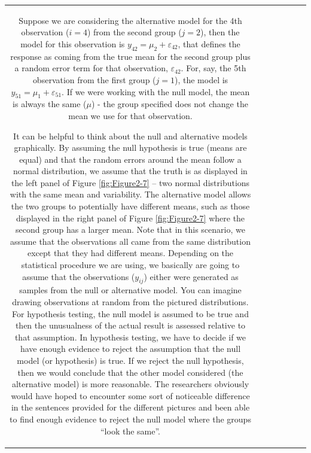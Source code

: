 \documentclass[]{book}
\theoremstyle{definition}
\theoremstyle{definition}
\theoremstyle{remark}
\begin{document}
\begin{longtable}[]{@{}ccccccc@{}}
\begin{minipage}[b]{0.10\columnwidth}
Suppose we are considering the alternative model for the 4th observation
(\(i=4\)) from the second group (\(j=2\)), then the model for this
observation is \(y_{42} = \mu_2 +\varepsilon_{42}\), that defines the
response as coming from the true mean for the second group plus a random
error term for that observation, \(\varepsilon_{42}\). For, say, the 5th
observation from the first group (\(j=1\)), the model is
\(y_{51} = \mu_1 +\varepsilon_{51}\). If we were working with the null
model, the mean is always the same (\(\mu\)) - the group specified does
not change the mean we use for that observation.

It can be helpful to think about the null and alternative models
graphically. By assuming the null hypothesis is true (means are equal)
and that the random errors around the mean follow a normal distribution,
we assume that the truth is as displayed in the left panel of Figure
\ref{fig:Figure2-7} -- two normal distributions with the same mean and
variability. The alternative model allows the two groups to potentially
have different means, such as those displayed in the right panel of
Figure \ref{fig:Figure2-7} where the second group has a larger mean.
Note that in this scenario, we assume that the observations all came
from the same distribution except that they had different means.
Depending on the statistical procedure we are using, we basically are
going to assume that the observations (\(y_{ij}\)) either were generated
as samples from the null or alternative model. You can imagine drawing
observations at random from the pictured distributions. For hypothesis
testing, the null model is assumed to be true and then the unusualness
of the actual result is assessed relative to that assumption. In
hypothesis testing, we have to decide if we have enough evidence to
reject the assumption that the null model (or hypothesis) is true. If we
reject the null hypothesis, then we would conclude that the other model
considered (the alternative model) is more reasonable. The researchers
obviously would have hoped to encounter some sort of noticeable
difference in the sentences provided for the different pictures and been
able to find enough evidence to reject the null model where the groups
``look the same''.






\end{minipage}
\end{longtable}
\end{document}
